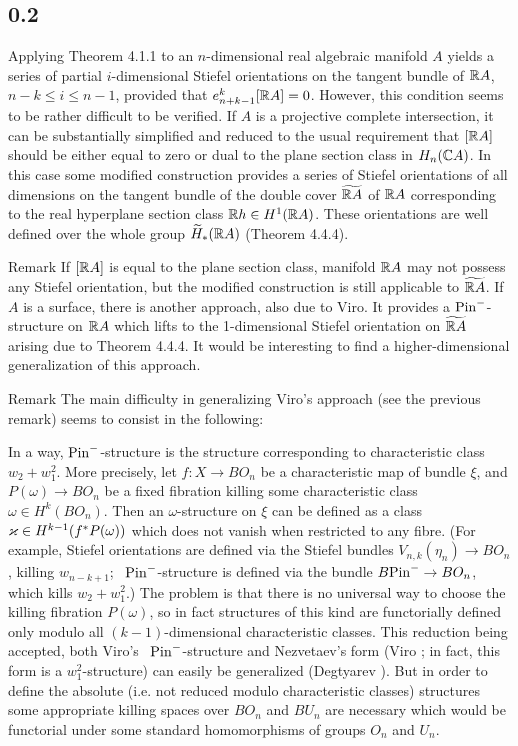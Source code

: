 \documentclass{article}
\begin{document}
\subsection*{ 0.2 }
Applying Theorem 4.1.1 to an $n$-dimensional real algebraic manifold $A$
yields a series of partial $i$-dimensional Stiefel orientations on the
tangent bundle of $\mathbb R A$, \ $n-k\le i\le n-1$, provided that
$e_{n+k-1}^k[\mathbb R A]=0$. However, this condition seems to be rather 
difficult to be verified. If $A$ is a projective complete intersection,
it can be substantially simplified and reduced to the usual requirement
that $[\mathbb R A]$ should be either equal to zero or dual to the plane section
class in $H_n(\mathbb C A)$. In this case some modified construction provides a
series of Stiefel orientations of all dimensions on the tangent bundle
of the double cover $\widetilde{\mathbb R A}$ of $\mathbb R A$ corresponding to the real hyperplane
section class $\mathbb R h\in H^1(\mathbb R A)$. These orientations are well defined
over the whole group $\widetilde H_*(\mathbb R A)$ (Theorem 4.4.4).
\begin{remark}{{Remark} If $[\mathbb R A]$ is equal to the plane section class, manifold
$\mathbb R A$ may not possess any Stiefel orientation, but the modified
construction is still applicable to $\widetilde{\mathbb R A}$. If $A$ is a surface, there
is another approach, also due to Viro. It provides a $\mathrm{Pin}^-$-structure
on $\mathbb R A$ which lifts to the 1-dimensional Stiefel orientation on $\widetilde{\mathbb R A}$
arising due to Theorem 4.4.4. It would be interesting to find a
higher-dimensional generalization of this approach.
}\end{remark}
\begin{remark}{{Remark} The main difficulty in generalizing Viro's approach
(see the previous remark) seems to consist in the following:

In a way, $\mathrm{Pin}^-$-structure is the structure corresponding to 
characteristic class $w_2+w_1^2$. More precisely, let $f:X\to BO_n$
be a characteristic map of bundle $\xi$, and $P(\omega)\to BO_n$ be
a fixed fibration killing some characteristic class $\omega\in H^k(BO_n)$.
Then an $\omega$-structure on $\xi$ can be defined as a class
$\varkappa\in H^{k-1}(f^*P(\omega))$ which does not vanish when restricted
to any fibre. (For example, Stiefel orientations are defined via
the Stiefel bundles $V_{n,k}(\eta_n)\to BO_n$, killing $w_{n-k+1}$; \
$\mathrm{Pin}^-$-structure is defined via the bundle $B\mathrm{Pin}^-\to BO_n$,
which kills $w_2+w_1^2$.) The problem is that there is no 
universal way to choose the killing fibration $P(\omega)$, so in fact
structures of this kind are functorially defined only modulo all
$(k-1)$-dimensional characteristic classes. This reduction being
accepted, both Viro's \ $\mathrm{Pin}^-$-structure and Nezvetaev's form (Viro \cite{8};
in fact, this form is a $w_1^2$-structure) can easily be generalized
(Degtyarev \cite{2}). But in order to define the absolute (i.e. not
reduced modulo characteristic classes) structures some appropriate
killing spaces over $BO_n$ and $BU_n$ are necessary which would be
functorial under some standard homomorphisms of groups $O_n$ and $U_n$.
}\end{remark}
\end{document}
